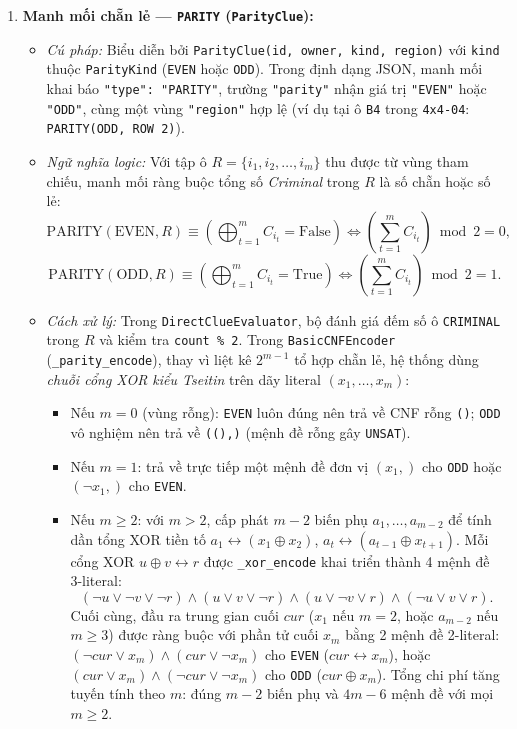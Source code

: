 \documentclass[12pt,a4paper]{article}
\begin{document}
\begin{enumerate}
    \item \textbf{Manh mối chẵn lẻ --- \texttt{PARITY} (\texttt{ParityClue}):}
    \begin{itemize}
        \item \emph{Cú pháp:} Biểu diễn bởi \texttt{ParityClue(id, owner, kind, region)} với \texttt{kind} thuộc \texttt{ParityKind} (\texttt{EVEN} hoặc \texttt{ODD}). Trong định dạng JSON, manh mối khai báo \texttt{"type": "PARITY"}, trường \texttt{"parity"} nhận giá trị \texttt{"EVEN"} hoặc \texttt{"ODD"}, cùng một vùng \texttt{"region"} hợp lệ (ví dụ tại ô \texttt{B4} trong \texttt{4x4-04}: \texttt{PARITY(ODD, ROW 2)}).
        \item \emph{Ngữ nghĩa logic:} Với tập ô $R = \{i_1, i_2, \dots, i_m\}$ thu được từ vùng tham chiếu, manh mối ràng buộc tổng số \emph{Criminal} trong $R$ là số chẵn hoặc số lẻ:
        \[
        \text{PARITY}(\text{EVEN}, R) \equiv \left(\bigoplus_{t=1}^{m} C_{i_t} = \text{False}\right) \iff \left(\sum_{t=1}^{m} C_{i_t}\right) \bmod 2 = 0,
        \]
        \[
        \text{PARITY}(\text{ODD}, R) \equiv \left(\bigoplus_{t=1}^{m} C_{i_t} = \text{True}\right) \iff \left(\sum_{t=1}^{m} C_{i_t}\right) \bmod 2 = 1.
        \]
        \item \emph{Cách xử lý:} Trong \texttt{DirectClueEvaluator}, bộ đánh giá đếm số ô \texttt{CRIMINAL} trong $R$ và kiểm tra \texttt{count \% 2}. Trong \texttt{BasicCNFEncoder} (\texttt{\_parity\_encode}), thay vì liệt kê $2^{m-1}$ tổ hợp chẵn lẻ, hệ thống dùng \emph{chuỗi cổng XOR kiểu Tseitin} trên dãy literal $(x_1, \dots, x_m)$:
        \begin{itemize}
            \item Nếu $m = 0$ (vùng rỗng): \texttt{EVEN} luôn đúng nên trả về CNF rỗng \texttt{()}; \texttt{ODD} vô nghiệm nên trả về \texttt{((),)} (mệnh đề rỗng gây \texttt{UNSAT}).
            \item Nếu $m = 1$: trả về trực tiếp một mệnh đề đơn vị $(x_1,)$ cho \texttt{ODD} hoặc $(\neg x_1,)$ cho \texttt{EVEN}.
            \item Nếu $m \ge 2$: với $m > 2$, cấp phát $m - 2$ biến phụ $a_1, \dots, a_{m-2}$ để tính dần tổng XOR tiền tố $a_1 \leftrightarrow (x_1 \oplus x_2)$, $a_t \leftrightarrow (a_{t-1} \oplus x_{t+1})$. Mỗi cổng XOR $u \oplus v \leftrightarrow r$ được \texttt{\_xor\_encode} khai triển thành 4 mệnh đề 3-literal:
            \[
            (\neg u \lor \neg v \lor \neg r) \land (u \lor v \lor \neg r) \land (u \lor \neg v \lor r) \land (\neg u \lor v \lor r).
            \]
            Cuối cùng, đầu ra trung gian cuối $\mathit{cur}$ ($x_1$ nếu $m=2$, hoặc $a_{m-2}$ nếu $m \ge 3$) được ràng buộc với phần tử cuối $x_m$ bằng 2 mệnh đề 2-literal: $(\neg \mathit{cur} \lor x_m) \land (\mathit{cur} \lor \neg x_m)$ cho \texttt{EVEN} ($\mathit{cur} \leftrightarrow x_m$), hoặc $(\mathit{cur} \lor x_m) \land (\neg \mathit{cur} \lor \neg x_m)$ cho \texttt{ODD} ($\mathit{cur} \oplus x_m$). Tổng chi phí tăng tuyến tính theo $m$: đúng $m - 2$ biến phụ và $4m - 6$ mệnh đề với mọi $m \ge 2$.
        \end{itemize}
    \end{itemize}


\end{enumerate}
\end{document}
